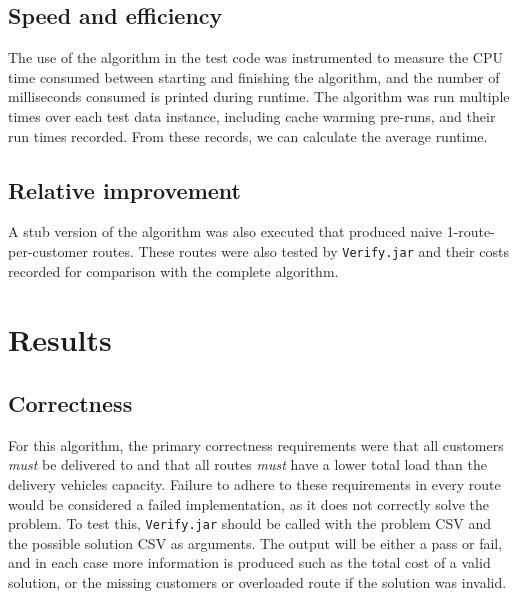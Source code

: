 \documentclass[a4paper]{article}
\begin{document}
        \subsection{Speed and efficiency}
        The use of the algorithm in the test code was instrumented to measure the CPU time consumed between starting and finishing the algorithm,
        and the number of milliseconds consumed is printed during runtime. The algorithm was run multiple times over each test data instance, including
        cache warming pre-runs, and their run times recorded. From these records, we can calculate the average runtime.

        \subsection{Relative improvement}
        A stub version of the algorithm was also executed that produced naive 1-route-per-customer routes. These routes were also tested by \texttt{Verify.jar}
        and their costs recorded for comparison with the complete algorithm.
    

    \section{Results}
        \subsection{Correctness}
        For this algorithm, the primary correctness requirements were that all customers \emph{must} be delivered to and that all routes \emph{must} have a lower
        total load than the delivery vehicles capacity. Failure to adhere to these requirements in every route would be considered a failed implementation, as it
        does not correctly solve the problem. To test this, \texttt{Verify.jar} should be called with the problem CSV and the possible solution CSV
        as arguments. The output will be either a pass or fail, and in each case more information is produced such as the total cost of a valid solution, or the
        missing customers or overloaded route if the solution was invalid.
\end{document}
